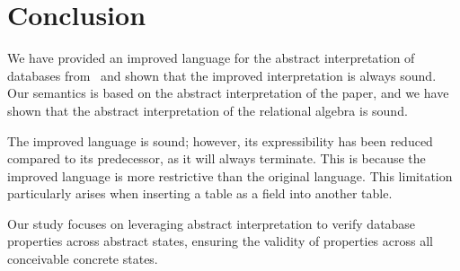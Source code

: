 \section{Conclusion} \label{sec:conclusion}
We have provided an improved language for the abstract interpretation of databases from~\cite{halder_abstract_2012} and shown that the improved interpretation is always sound.
Our semantics is based on the abstract interpretation of the paper, and we have shown that the abstract interpretation of the relational algebra is sound.

The improved language is sound; however, its expressibility has been reduced compared to its predecessor, as it will always terminate.
This is because the improved language is more restrictive than the original language.
This limitation particularly arises when inserting a table as a field into another table.

Our study focuses on leveraging abstract interpretation to verify database properties across abstract states, ensuring the validity of properties across all conceivable concrete states.
